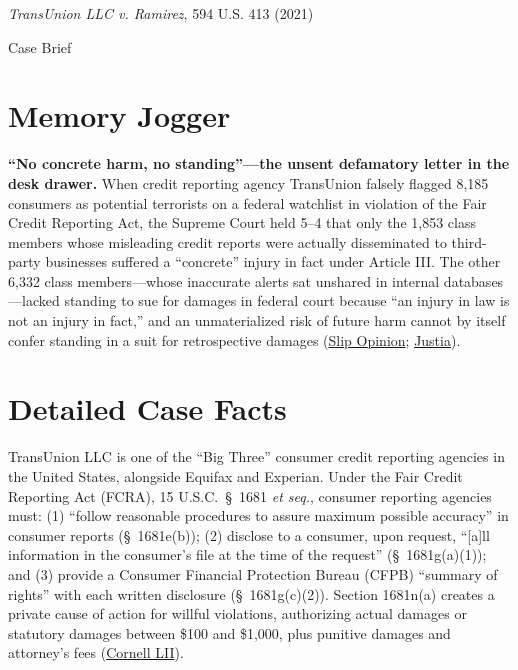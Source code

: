 \documentclass[12pt]{article}
\begin{document}
\begin{center}
{\LARGE \textit{TransUnion LLC v. Ramirez}, 594 U.S. 413 (2021)\par}
\vspace{0.8em}
{\large Case Brief\par}
\end{center}
\vspace{1em}

\section{Memory Jogger}

\textbf{``No concrete harm, no standing''---the unsent defamatory letter in the desk drawer.} When credit reporting agency TransUnion falsely flagged 8,185 consumers as potential terrorists on a federal watchlist in violation of the Fair Credit Reporting Act, the Supreme Court held 5--4 that only the 1,853 class members whose misleading credit reports were actually disseminated to third-party businesses suffered a ``concrete'' injury in fact under Article III. The other 6,332 class members---whose inaccurate alerts sat unshared in internal databases---lacked standing to sue for damages in federal court because ``an injury in law is not an injury in fact,'' and an unmaterialized risk of future harm cannot by itself confer standing in a suit for retrospective damages (\href{https://www.supremecourt.gov/opinions/20pdf/20-297_4g25.pdf}{Slip Opinion}; \href{https://supreme.justia.com/cases/federal/us/594/20-297/}{Justia}).

\section{Detailed Case Facts}

TransUnion LLC is one of the ``Big Three'' consumer credit reporting agencies in the United States, alongside Equifax and Experian. Under the Fair Credit Reporting Act (FCRA), 15 U.S.C.~\S~1681 \textit{et seq.}, consumer reporting agencies must: (1) ``follow reasonable procedures to assure maximum possible accuracy'' in consumer reports (\S~1681e(b)); (2) disclose to a consumer, upon request, ``[a]ll information in the consumer's file at the time of the request'' (\S~1681g(a)(1)); and (3) provide a Consumer Financial Protection Bureau (CFPB) ``summary of rights'' with each written disclosure (\S~1681g(c)(2)). Section 1681n(a) creates a private cause of action for willful violations, authorizing actual damages or statutory damages between \$100 and \$1,000, plus punitive damages and attorney's fees (\href{https://www.law.cornell.edu/supremecourt/text/20-297}{Cornell LII}).
\end{document}
